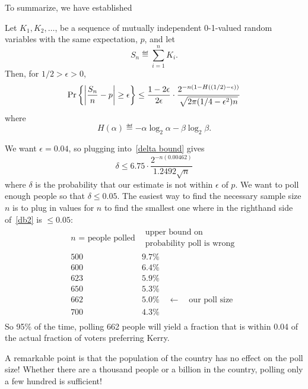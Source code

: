 \documentclass[11pt,twoside]{article}
\begin{document}
To summarize, we have established
\begin{theorem}\label{bs}
Let $K_1, K_2, \dots$, be a sequence of mutually independent 0-1-valued
random variables with the same expectation, $p$, and let
\[
S_n \eqdef \sum_{i=1}^n K_i.
\]
Then, for $1/2 > \epsilon > 0$,
\begin{equation}\label{delta bound}
\mathop{\textup{Pr}}\nolimits\left\{\left|\frac{S_n}{n} - p\right| \geq \epsilon\right\}
\leq 
\frac{1 - 2\epsilon}{2\epsilon} \cdot
		\frac{2^{-n (1 - H((1/2) - \epsilon))}}{\sqrt{2 \pi (1/4 - \epsilon^2) n}}
\end{equation}
where
\[
H(\alpha) \eqdef - \alpha\log_2 \alpha - \beta \log_2 \beta.
\]
\end{theorem}

We want $\epsilon = 0.04$, so plugging into~\eqref{delta bound} gives 
\begin{equation}\label{db2}
\delta \leq 6.75 \cdot \frac{2^{-n(0.00462)}}{1.2492 \sqrt{n}}
\end{equation}
where $\delta$ is the probability that our estimate is not within
$\epsilon$ of $p$.  We want to poll enough people so that $\delta \leq
0.05$.  The easiest way to find the necessary sample size $n$ is to plug
in values for $n$ to find the smallest one where in the righthand side
of~\eqref{db2} is $ \leq 0.05$:
\[
\begin{array}{c|l}
\mbox{$n$ = people polled} & \begin{array}{cc}
\mbox{upper bound on} \\
\mbox{probability poll is wrong}
\end{array} \\
\hline
500 &  9.7\% \\
600 &  6.4\% \\
623 &  5.9\% \\
650 &  5.3\% \\
662 &  5.0\% \quad \leftarrow \quad \mbox{our poll size} \\
700 &  4.3\% \\
\end{array}
\]
So 95\% of the time, polling 662 people will yield a fraction that is
within 0.04 of the actual fraction of voters preferring Kerry.

A remarkable point is that the population of the country has no
effect on the poll size!  Whether there are a thousand people or a
billion in the country, polling only a few hundred is sufficient!
\end{document}
